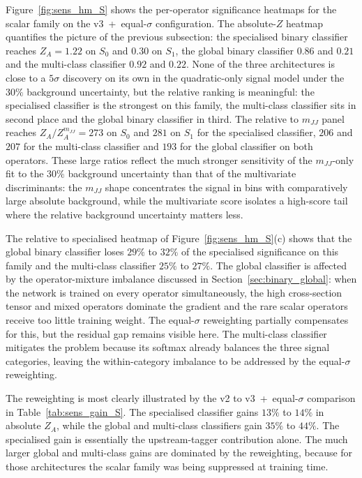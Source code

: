 Figure~\ref{fig:sens_hm_S} shows the per-operator significance heatmaps for the scalar family on the v3~+~equal-$\sigma$ configuration. The absolute-$Z$ heatmap quantifies the picture of the previous subsection: the specialised binary classifier reaches $Z_A=1.22$ on $S_0$ and $0.30$ on $S_1$, the global binary classifier $0.86$ and $0.21$ and the multi-class classifier $0.92$ and $0.22$. None of the three architectures is close to a $5\sigma$ discovery on its own in the quadratic-only signal model under the $30\%$ background uncertainty, but the relative ranking is meaningful: the specialised classifier is the strongest on this family, the multi-class classifier sits in second place and the global binary classifier in third. The relative to $m_{JJ}$ panel reaches $Z_A/Z_A^{m_{JJ}}=273$ on $S_0$ and $281$ on $S_1$ for the specialised classifier, $206$ and $207$ for the multi-class classifier and $193$ for the global classifier on both operators. These large ratios reflect the much stronger sensitivity of the $m_{JJ}$-only fit to the $30\%$ background uncertainty than that of the multivariate discriminants: the $m_{JJ}$ shape concentrates the signal in bins with comparatively large absolute background, while the multivariate score isolates a high-score tail where the relative background uncertainty matters less.

The relative to specialised heatmap of Figure~\ref{fig:sens_hm_S}(c) shows that the global binary classifier loses $29\%$ to $32\%$ of the specialised significance on this family and the multi-class classifier $25\%$ to $27\%$. The global classifier is affected by the operator-mixture imbalance discussed in Section~\ref{sec:binary_global}: when the network is trained on every operator simultaneously, the high cross-section tensor and mixed operators dominate the gradient and the rare scalar operators receive too little training weight. The equal-$\sigma$ reweighting partially compensates for this, but the residual gap remains visible here. The multi-class classifier mitigates the problem because its softmax already balances the three signal categories, leaving the within-category imbalance to be addressed by the equal-$\sigma$ reweighting.

The reweighting is most clearly illustrated by the v2 to v3~+~equal-$\sigma$ comparison in Table~\ref{tab:sens_gain_S}. The specialised classifier gains $13\%$ to $14\%$ in absolute $Z_A$, while the global and multi-class classifiers gain $35\%$ to $44\%$. The specialised gain is essentially the upstream-tagger contribution alone. The much larger global and multi-class gains are dominated by the reweighting, because for those architectures the scalar family was being suppressed at training time.

